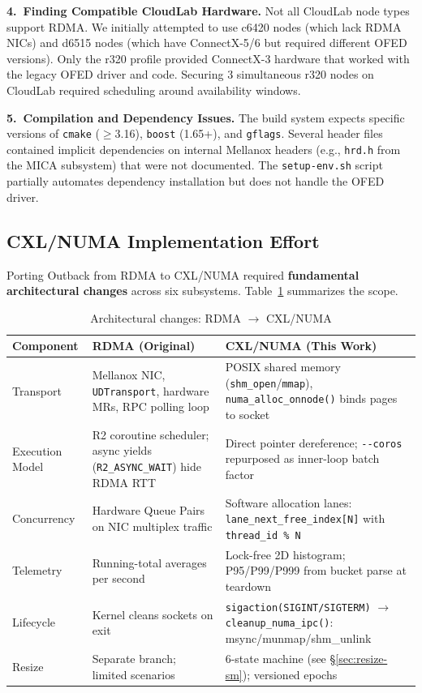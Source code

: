 \documentclass[conference]{IEEEtran}
\begin{document}
\textbf{4.\ Finding Compatible CloudLab Hardware.}
Not all CloudLab node types support RDMA. We initially attempted to use c6420 nodes (which lack RDMA NICs) and d6515 nodes (which have ConnectX-5/6 but required different OFED versions). Only the r320 profile provided ConnectX-3 hardware that worked with the legacy OFED driver and code. Securing 3 simultaneous r320 nodes on CloudLab required scheduling around availability windows.

\textbf{5.\ Compilation and Dependency Issues.}
The build system expects specific versions of \texttt{cmake} ($\geq$3.16), \texttt{boost} (1.65+), and \texttt{gflags}. Several header files contained implicit dependencies on internal Mellanox headers (e.g., \texttt{hrd.h} from the MICA subsystem) that were not documented. The \texttt{setup-env.sh} script partially automates dependency installation but does not handle the OFED driver.

\subsection{CXL/NUMA Implementation Effort}

Porting Outback from RDMA to CXL/NUMA required \textbf{fundamental architectural changes} across six subsystems. Table~\ref{tab:impl-comparison} summarizes the scope.

\begin{table}[H]
\centering
\caption{Architectural changes: RDMA $\to$ CXL/NUMA}
\label{tab:impl-comparison}
\small
\begin{tabular}{@{}p{2.8cm}p{5cm}p{5.5cm}@{}}
\toprule
\textbf{Component} & \textbf{RDMA (Original)} & \textbf{CXL/NUMA (This Work)} \\
\midrule
Transport &
  Mellanox NIC, \texttt{UDTransport}, hardware MRs, RPC polling loop &
  POSIX shared memory (\texttt{shm\_open}/\texttt{mmap}), \texttt{numa\_alloc\_onnode()} binds pages to socket \\
\addlinespace
Execution Model &
  R2 coroutine scheduler; async yields (\texttt{R2\_ASYNC\_WAIT}) hide RDMA RTT &
  Direct pointer dereference; \texttt{-{}-coros} repurposed as inner-loop batch factor \\
\addlinespace
Concurrency &
  Hardware Queue Pairs on NIC multiplex traffic &
  Software allocation lanes: \texttt{lane\_next\_free\_index[N]} with \texttt{thread\_id \% N} \\
\addlinespace
Telemetry &
  Running-total averages per second &
  Lock-free 2D histogram; P95/P99/P999 from bucket parse at teardown \\
\addlinespace
Lifecycle &
  Kernel cleans sockets on exit &
  \texttt{sigaction(SIGINT/SIGTERM)} $\to$ \texttt{cleanup\_numa\_ipc()}: msync/munmap/shm\_unlink \\
\addlinespace
Resize &
  Separate branch; limited scenarios &
  6-state machine (see \S\ref{sec:resize-sm}); versioned epochs \\
\bottomrule
\end{tabular}
\end{table}
\end{document}
